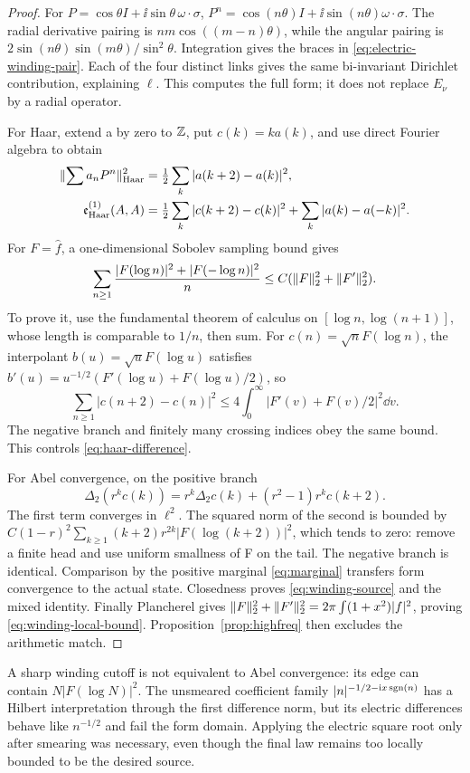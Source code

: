 \begin{proof}
For $P=\cos\theta I+\ii\sin\theta\,\omega\cdot\sigma$,
$P^n=\cos(n\theta)I+\ii\sin(n\theta)\omega\cdot\sigma$.
The radial derivative pairing is $nm\cos((m-n)\theta)$, while the
angular pairing is $2\sin(n\theta)\sin(m\theta)/\sin^2\theta$.
Integration gives the braces in \eqref{eq:electric-winding-pair}.
Each of the four distinct links gives the same bi-invariant Dirichlet
contribution, explaining $\ell$. This computes the full form; it does
not replace $E_\nu$ by a radial operator.

For Haar, extend a by zero to $\mathbb Z$, put $c(k)=ka(k)$, and use direct
Fourier algebra to obtain
\begin{align}
\lVert \sum a_nP^n\rVert_{\rm Haar}^2
 &=\tfrac12\sum_k|a(k+2)-a(k)|^2,\\
\mathfrak e_{\rm Haar}^{(1)}(A,A)
 &=\tfrac12\sum_k|c(k+2)-c(k)|^2+
                         \sum_k|a(k)-a(-k)|^2.\label{eq:haar-difference}
\end{align}
For $F=\widehat f$, a one-dimensional Sobolev sampling bound gives
\begin{equation}
\sum_{n\ge1}\frac{|F(\log n)|^2+|F(-\log n)|^2}{n}
 \le C(\lVert F\rVert_2^2+\lVert F'\rVert_2^2).
\end{equation}
To prove it, use the fundamental theorem of calculus on
$[\log n,\log(n+1)]$, whose length is comparable to $1/n$, then sum.
For $c(n)=\sqrt n F(\log n)$, the interpolant
$b(u)=\sqrt u F(\log u)$ satisfies
$b'(u)=u^{-1/2}(F'(\log u)+F(\log u)/2)$, so
\begin{equation}
\sum_{n\ge1}|c(n+2)-c(n)|^2
\le4\int_0^\infty|F'(v)+F(v)/2|^2\dd v.
\end{equation}
The negative branch and finitely many crossing indices obey the same
bound. This controls \eqref{eq:haar-difference}.

For Abel convergence, on the positive branch
\begin{equation}
\Delta_2(r^kc(k))=r^k\Delta_2c(k)+(r^2-1)r^kc(k+2).
\end{equation}
The first term converges in $\ell^2$. The squared norm of the second
is bounded by
$C(1-r)^2\sum_{k\ge1}(k+2)r^{2k}|F(\log(k+2))|^2$, which tends to
zero: remove a finite head and use uniform smallness of F on the tail.
The negative branch is identical. Comparison by the positive marginal
\eqref{eq:marginal} transfers form convergence to the actual state.
Closedness proves \eqref{eq:winding-source} and the mixed identity.
Finally Plancherel gives
$\lVert F\rVert_2^2+\lVert F'\rVert_2^2=2\pi\int(1+x^2)|f|^2$, proving
\eqref{eq:winding-local-bound}. Proposition~\ref{prop:highfreq} then excludes
the arithmetic match.
\end{proof}
A sharp winding cutoff is not equivalent to Abel convergence: its
edge can contain $N|F(\log N)|^2$. The unsmeared coefficient family
$|n|^{-1/2-\mathrm i x\operatorname{sgn}(n)}$ has a Hilbert interpretation through the
first difference norm, but its electric differences behave like
$n^{-1/2}$ and fail the form domain. Applying the electric square root
only after smearing was necessary, even though the final law remains
too locally bounded to be the desired source.

